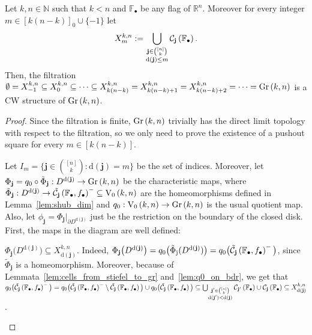 \begin{theorem}\label{thm:gr_is_cw} Let $k,n\in\mathbb{N}$ such that $k<n$ and $\mathbb{F}_{\bullet}$ be any flag of $\mathbb{R}^n$. Moreover for every integer $m\in[k(n-k)]_0\cup\{-1\}$ let \[X_m^{k,n}:=\bigcup_{\substack{\mathbf{j}\in\binom{[n]}{k}\\\mathrm{d}(\mathbf{j})\leq m}}\mathcal{C}_{\mathbf{j}}\left(\mathbb{F}_{\bullet}\right).\]
Then, the filtration $\emptyset=X_{-1}^{k,n}\subseteq X_0^{k,n}\subseteq\cdots\subseteq X_{k(n-k)}^{k,n}=X_{k(n-k)+1}^{k,n}=X_{k(n-k)+2}^{k,n}=\cdots=\Gr{k}{n}$ is a CW structure of $\Gr{k}{n}$.
\end{theorem}
\begin{proof}
Since the filtration is finite, $\Gr{k}{n}$ trivially has the direct limit topology with respect to the filtration, so we only need to prove the existence of a pushout square for every $m\in[k(n-k)]$.
\begin{center}
\end{center}
Let $I_m=\big\{\mathbf{j}\in\binom{[n]}{k}:\mathrm{d}(\mathbf{j})=m\big\}$ be the set of indices. Moreover, let $\Phi_{\mathbf{j}}=q_0\circ\tilde{\Phi}_{\mathbf{j}}:D^{\mathrm{d}(\mathbf{j})}\to \Gr{k}{n}$ be the characteristic maps, where $\tilde{\Phi}_{\mathbf{j}}:D^{\mathrm{d}(\mathbf{j})}\to\stcell{j}^-\subseteq\StO{k}{n}$ are the homeomorphisms defined in Lemma~\ref{lem:shub_dim} and $q_0:\StO{k}{n}\to\Gr{k}{n}$ is the usual quotient map. Also, let $\phi_{\mathbf{j}}=\Phi_{\mathbf{j}}|_{\partial D^{\mathrm{d}(\mathbf{j})}}$ just be the restriction on the boundary of the closed disk.
First, the maps in the diagram are well defined:
\begin{i_enum}
\item $\Phi_{\mathbf{j}}\big(D^{\mathrm{d}(\mathbf{j})}\big)\subseteq X_{\mathrm{d}(\mathbf{j})}^{k,n}$. Indeed, $\Phi_{\mathbf{j}}\big(D^{\mathrm{d}(\mathbf{j})}\big)=q_0\big(\tilde{\Phi}_{\mathrm{j}}(D^{\mathrm{d}(\mathbf{j})})\big)=q_0\big(\tilde{\mathcal{C}}_{\mathbf{j}}\left(\mathbb{F}_{\bullet},f_{\bullet}\right)^-\big)$, since $\tilde{\Phi}_{\mathbf{j}}$ is a homeomorphism. Moreover, because of Lemmata~\ref{lem:cells_from_stiefel_to_gr} and~\ref{lem:q0_on_bdr}, we get that $q_0\big(\tilde{\mathcal{C}}_{\mathbf{j}}\left(\mathbb{F}_{\bullet},f_{\bullet}\right)^-\big)=q_0\big(\tilde{\mathcal{C}}_{\mathbf{j}}\left(\mathbb{F}_{\bullet},f_{\bullet}\right)^-\setminus\tilde{\mathcal{C}}_{\mathbf{j}}\left(\mathbb{F}_{\bullet},f_{\bullet}\right)\big)\cup q_0\big(\tilde{\mathcal{C}}_{\mathbf{j}}\left(\mathbb{F}_{\bullet},f_{\bullet}\right)\big)\subseteq\bigcup_{\substack{\mathbf{j}'\in\binom{[n]}{k}\\\mathrm{d}(\mathbf{j}')<\mathrm{d}(\mathbf{j})}}\mathcal{C}_{\mathbf{j'}}\left(\mathbb{F}_{\bullet}\right)\cup\mathcal{C}_{\mathbf{j}}\left(\mathbb{F}_{\bullet}\right)\subseteq X_{\mathrm{d}(\mathbf{j})}^{k,n}$.

\end{i_enum}
\end{proof}
